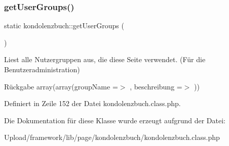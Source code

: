 \subsubsection{\texorpdfstring{get\+User\+Groups()}{getUserGroups()}}
{\footnotesize\ttfamily static kondolenzbuch\+::get\+User\+Groups (\begin{DoxyParamCaption}{ }\end{DoxyParamCaption})\hspace{0.3cm}{\ttfamily [static]}}

Liest alle Nutzergruppen aus, die diese Seite verwendet. (Für die Benutzeradministration) \begin{DoxyReturn}{Rückgabe}
array(array(\textquotesingle{}group\+Name\textquotesingle{} =$>$ \textquotesingle{}\textquotesingle{}, \textquotesingle{}beschreibung\textquotesingle{} =$>$ \textquotesingle{}\textquotesingle{})) 
\end{DoxyReturn}


Definiert in Zeile 152 der Datei kondolenzbuch.\+class.\+php.



Die Dokumentation für diese Klasse wurde erzeugt aufgrund der Datei\+:\begin{DoxyCompactItemize}
\item 
Upload/framework/lib/page/kondolenzbuch/kondolenzbuch.\+class.\+php\end{DoxyCompactItemize}
